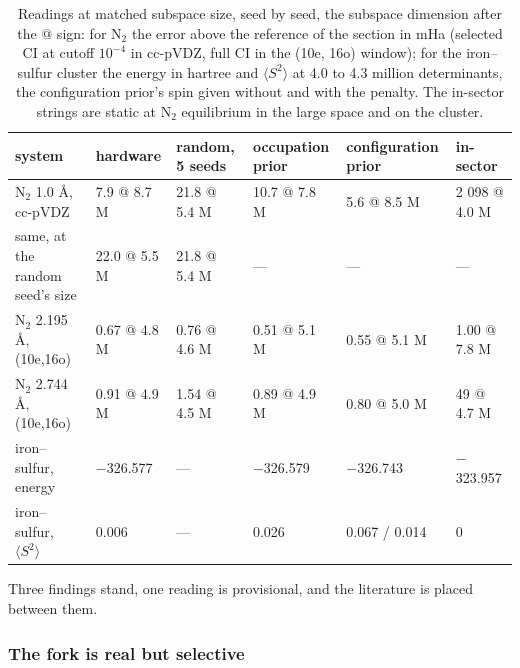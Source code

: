 \documentclass[11pt]{article}
\begin{document}
\begin{table}[htbp]
\centering
\caption{Readings at matched subspace size, seed by seed, the subspace dimension after the @ sign: for N$_2$ the error above the reference of the section in mHa (selected CI at cutoff $10^{-4}$ in cc-pVDZ, full CI in the (10e, 16o) window); for the iron--sulfur cluster the energy in hartree and $\langle S^{2}\rangle$ at 4.0 to 4.3 million determinants, the configuration prior's spin given without and with the penalty. The in-sector strings are static at N$_2$ equilibrium in the large space and on the cluster.}\label{tab:11}
\footnotesize
\renewcommand{\arraystretch}{1.15}

\begin{tabularx}{\linewidth}{@{}>{\hsize=1.000\hsize\raggedright\arraybackslash}Xlllll@{}}
\toprule
system & hardware & random, 5 seeds & occupation prior & configuration prior & in-sector \\
\midrule
N$_2$ 1.0 \AA{}, cc-pVDZ & 7.9 @ 8.7 M & 21.8 @ 5.4 M & 10.7 @ 7.8 M & 5.6 @ 8.5 M & 2 098 @ 4.0 M \\
same, at the random seed's size & 22.0 @ 5.5 M & 21.8 @ 5.4 M & --- & --- & --- \\
N$_2$ 2.195 \AA{}, (10e,16o) & 0.67 @ 4.8 M & 0.76 @ 4.6 M & 0.51 @ 5.1 M & 0.55 @ 5.1 M & 1.00 @ 7.8 M \\
N$_2$ 2.744 \AA{}, (10e,16o) & 0.91 @ 4.9 M & 1.54 @ 4.5 M & 0.89 @ 4.9 M & 0.80 @ 5.0 M & 49 @ 4.7 M \\
iron--sulfur, energy & $-$326.577 & --- & $-$326.579 & $-$326.743 & $-$323.957 \\
iron--sulfur, $\langle S^{2}\rangle$ & 0.006 & --- & 0.026 & 0.067 / 0.014 & 0 \\
\bottomrule
\end{tabularx}
\end{table}


Three findings stand, one reading is provisional, and the literature is placed between them.

\subsubsection{The fork is real but selective}\label{sec:3.7.2}
\end{document}
